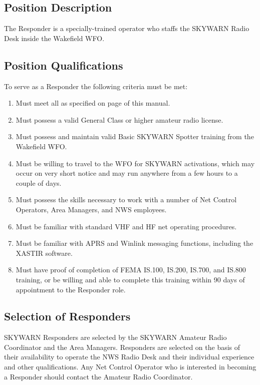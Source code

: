 \documentclass[pdflatex,letterpaper,twoside,12pt]{book}
\begin{document}
\subsection{Position Description}

The Responder is a specially-trained operator who staffs the SKYWARN Radio Desk inside the Wakefield WFO.

\subsection{Position Qualifications}

To serve as a Responder the following criteria must be met:

\begin{enumerate}
\item Must meet all  as specified on page \pageref{nco-criteria} of this manual.
\item Must possess a valid General Class or higher amateur radio license.
\item Must possess and maintain valid Basic SKYWARN Spotter training from the Wakefield WFO.
\item Must be willing to travel to the WFO for SKYWARN activations, which may occur on very short notice and may run anywhere from a few hours to a couple of days.
\item Must possess the skills necessary to work with a number of Net Control Operators, Area Managers, and NWS employees.
\item Must be familiar with standard VHF and HF net operating procedures.
\item Must be familiar with APRS and Winlink messaging functions, including the XASTIR software.
\item Must have proof of completion of FEMA IS.100, IS.200, IS.700, and IS.800 training, or be willing and able to complete this training within 90 days of appointment to the Responder role.
\end{enumerate}

\subsection{Selection of Responders}

SKYWARN Responders are selected by the SKYWARN Amateur Radio Coordinator and the Area Managers.  Responders are selected on the basis of their availability to operate the NWS Radio Desk and their individual experience and other qualifications.  Any Net Control Operator who is interested in becoming a Responder should contact the Amateur Radio Coordinator.
\end{document}
